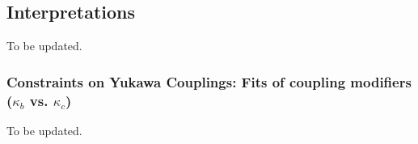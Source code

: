 \subsection{Interpretations}
To be updated.
\subsubsection{Constraints on Yukawa Couplings: Fits of coupling modifiers ($\kappa_{b}$ vs. $\kappa_{c}$)}
To be updated.
